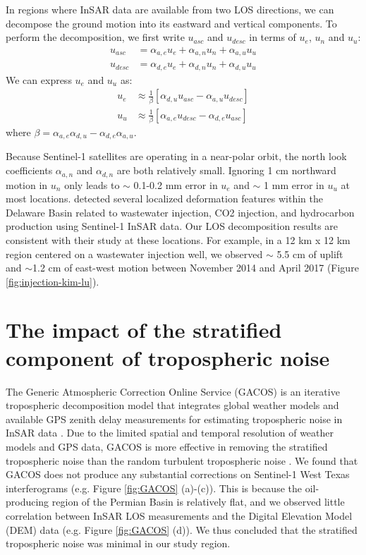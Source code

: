 \documentclass[draft,grl]{agutexSI2019}
\begin{document}
\begin{article}
In regions where InSAR data are available from two LOS directions, we can decompose the ground motion into its eastward and vertical components.
To perform the decomposition, we first write $u_{asc}$ and $u_{desc}$ in terms of $u_e$, $u_n$ and $u_u$:
\begin{align}
    u_{asc} &= \alpha_{a,e} u_{e} + \alpha_{a,n} u_{n} + \alpha_{a,u} u_{u}\\
    u_{desc} &= \alpha_{d,e} u_{e} + \alpha_{d,n} u_{n} + \alpha_{d,u} u_{u}
\end{align}
We can express $u_e$ and $u_u$ as:
\begin{align}
    u_{e} &\approx  \frac{1}{\beta}  \left[\alpha_{d,u}  u_{asc} - \alpha_{a,u} u_{desc} \right] \\
    u_{u} &\approx  \frac{1}{\beta}  \left[\alpha_{a,e} u_{desc} - \alpha_{d,e}  u_{asc}  \right] 
\end{align}
where  $ \beta = {\alpha_{a,e} \alpha_{d,u}- \alpha_{d,e} \alpha_{a,u}} $.

Because Sentinel-1 satellites are operating in a near-polar orbit, the north look coefficients $\alpha_{a,n}$ and $\alpha_{d,n}$ are both relatively small. Ignoring 1 cm northward motion in $u_n$ only leads to $\sim$ 0.1-0.2 mm error in $u_e$ and $\sim$ 1 mm error in $u_u$ at most locations.  detected several localized deformation features within the Delaware Basin related to wastewater injection, CO2 injection, and hydrocarbon production using Sentinel-1 InSAR data.  Our LOS decomposition results are consistent with their study at these locations. For example, in a 12 km x 12 km region centered on a wastewater injection well, we observed $\sim$ 5.5 cm of uplift and $\sim$1.2 cm of east-west motion between November 2014 and April 2017 (Figure \ref{fig:injection-kim-lu}). 

\clearpage
\section{The impact of the stratified component of tropospheric noise}
\label{sec:noise-quant}
The Generic Atmospheric Correction Online Service (GACOS) is an iterative tropospheric decomposition model that integrates global weather models and available GPS zenith delay measurements for estimating tropospheric noise in InSAR data \cite{yu2018interferometric}. Due to the limited spatial and temporal resolution of weather models and GPS data, GACOS is more effective in removing the stratified tropospheric noise \cite{Doin2009} than the random turbulent tropospheric noise \cite{Emardson2003}. We found that GACOS does not produce any substantial corrections on Sentinel-1 West Texas interferograms (e.g. Figure \ref{fig:GACOS} (a)-(c)). This is because the oil-producing region of the Permian Basin is relatively flat, and we observed little correlation between InSAR LOS measurements and the Digital Elevation Model (DEM) data (e.g. Figure \ref{fig:GACOS} (d)). We thus concluded that the stratified tropospheric noise was minimal in our study region.



\end{article}
\end{document}
